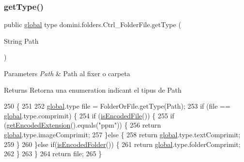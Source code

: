 \subsubsection{\texorpdfstring{get\+Type()}{getType()}}
{\footnotesize\ttfamily public \hyperlink{classglobal_1_1global}{global} type domini.\+folders.\+Ctrl\+\_\+\+Folder\+File.\+get\+Type (\begin{DoxyParamCaption}\item[{String}]{Path }\end{DoxyParamCaption})\hspace{0.3cm}{\ttfamily [inline]}}


\begin{DoxyParams}{Parameters}
{\em Path} & Path al fixer o carpeta \\
\hline
\end{DoxyParams}
\begin{DoxyReturn}{Returns}
Retorna una enumeration indicant el tipus de Path 
\end{DoxyReturn}

\begin{DoxyCode}
250                                            \{
251 
252         \hyperlink{namespaceglobal}{global}.type file = FolderOrFile.getType(Path);
253         \textcolor{keywordflow}{if} (file == \hyperlink{namespaceglobal}{global}.type.comprimit) \{
254             \textcolor{keywordflow}{if} (\hyperlink{classdomini_1_1folders_1_1Ctrl__FolderFile_a3198690e1ecc46e00431f35d87080d79}{isEncodedFile}()) \{
255                 \textcolor{keywordflow}{if} (\hyperlink{classdomini_1_1folders_1_1Ctrl__FolderFile_a61d9dfde0932787a2398af3ddf99c34b}{getEncodedExtension}().equals(\textcolor{stringliteral}{"ppm"})) \{
256                     \textcolor{keywordflow}{return} \hyperlink{namespaceglobal}{global}.type.imageComprimit;
257                 \}\textcolor{keywordflow}{else} \{
258                     \textcolor{keywordflow}{return} \hyperlink{namespaceglobal}{global}.type.textComprimit;
259                 \}
260             \}\textcolor{keywordflow}{else} \textcolor{keywordflow}{if}(\hyperlink{classdomini_1_1folders_1_1Ctrl__FolderFile_a095e6037e5cdf9a43806a308ca028791}{isEncodedFolder}()) \{
261                 \textcolor{keywordflow}{return} \hyperlink{namespaceglobal}{global}.type.folderComprimit;
262             \}
263         \}
264         \textcolor{keywordflow}{return} file;
265     \}
\end{DoxyCode}
\mbox{\label{classdomini_1_1folders_1_1Ctrl__FolderFile_a47a7ad955f1c579384dfba08bc7be8e0}} 
